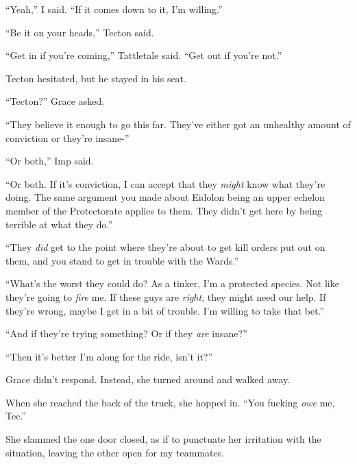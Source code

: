 ``Yeah,'' I said.  ``If it comes down to it, I'm willing.''



``Be it on your heads,'' Tecton said.



``Get in if you're coming,'' Tattletale said.  ``Get out if you're not.''



Tecton hesitated, but he stayed in his seat.



``Tecton?'' Grace asked.



``They believe it enough to go this far.  They've either got an unhealthy amount of conviction or they're insane-''



``Or both,'' Imp said.



``Or both.  If it's conviction, I can accept that they \emph{might} know what they're doing.  The same argument you made about Eidolon being an upper echelon member of the Protectorate applies to them.  They didn't get here by being terrible at what they do.''



``They \emph{did} get to the point where they're about to get kill orders put out on them, and you stand to get in trouble with the Wards.''



``What's the worst they could do?  As a tinker, I'm a protected species.  Not like they're going to \emph{fire} me.  If these guys are \emph{right}, they might need our help.  If they're wrong, maybe I get in a bit of trouble.  I'm willing to take that bet.''



``And if they're trying something?  Or if they \emph{are} insane?''



``Then it's better I'm along for the ride, isn't it?''



Grace didn't respond.  Instead, she turned around and walked away.



When she reached the back of the truck, she hopped in.  ``You fucking \emph{owe} me, Tec.''



She slammed the one door closed, as if to punctuate her irritation with the situation, leaving the other open for my teammates.



